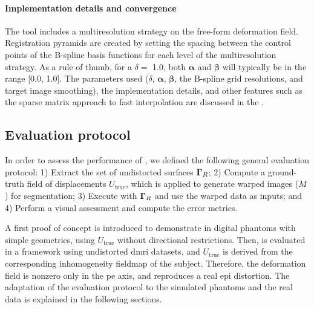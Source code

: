 \paragraph*{Implementation details and convergence}%
\label{sec:regseg-conv_report}
The \regseg{} tool includes a multiresolution strategy on the free-form deformation field.
Registration pyramids are created by setting the spacing between the control points of the B-spline basis
  functions for each level of the multiresolution strategy.
As a rule of thumb, for a $\delta =$ 1.0, both $\boldsymbol{\alpha}$
  and $\boldsymbol{\beta}$ will typically be in the range [0.0, 1.0].
The parameters used ($\delta$, $\boldsymbol{\alpha}$, $\boldsymbol{\beta}$, the B-spline grid resolutions,
  and target image smoothing), the implementation details, and other features such as the sparse matrix
  approach to fast interpolation are discussed in the .

\subsection{Evaluation protocol}\label{sec:regseg-evaluation_protocol}
In order to assess the performance of \regseg{}, we defined the following general
  evaluation protocol:
1) Extract the set of undistorted surfaces $\boldsymbol{\Gamma}_R$;
2) Compute a ground-truth field of displacements $U_\text{true}$, which is applied to
  generate warped images ($M$) for segmentation;
3) Execute \regseg{} with $\boldsymbol{\Gamma}_R$ and use the warped data as inputs; and
4) Perform a visual assessment and compute the error metrics.

A first proof of concept is introduced to demonstrate \regseg{} in digital phantoms
  with simple geometries, using $U_\text{true}$ without directional restrictions.
Then, \regseg{} is evaluated in a framework using undistorted \gls*{dmri} datasets,
  and $U_\text{true}$ is derived from the corresponding inhomogeneity fieldmap of
  the subject.
Therefore, the deformation field is nonzero only in the \acrfull*{pe} axis,
  and reproduces a real \gls*{epi} distortion.
The adaptation of the evaluation protocol to the simulated phantoms and the real data is
  explained in the following sections.

